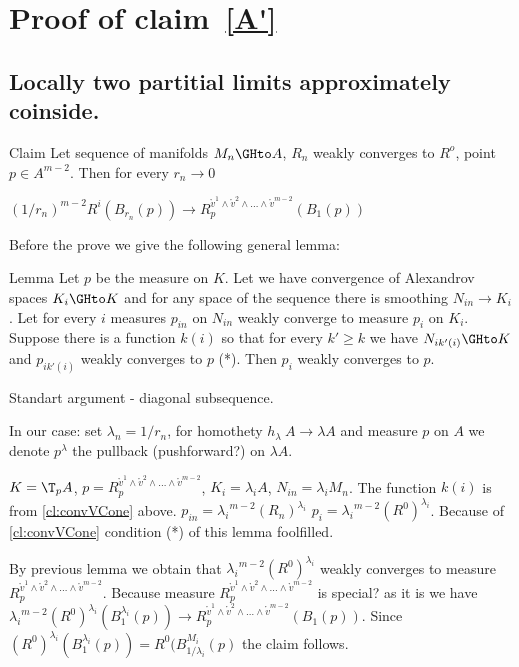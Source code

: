 \section{Proof of claim~\ref{A'}}\label{sec:codim2}
\subsection{Locally two partitial limits approximately coinside.}
\begin{thm}{Claim}\label{cl:convLocCodim2}
Let sequence of manifolds $M_n\GHto A$,
$R_n$ weakly converges to $R^o$,
point $p\in A^{m-2}$. Then
for every  $r_n\to 0$

$(1/r_n)^{m-2}R^i(B_{r_n}(p))\to R_p^{\mathring{v}^1\wedge \mathring{v}^2\wedge\dots\wedge \mathring{v}^{m-2}}(B_{1}(p))$

\end{thm}

Before the prove we give the following general lemma:

\begin{thm}{Lemma}
Let $p $ be the measure on $K$.
Let we have convergence of Alexandrov spaces $K_i\GHto K$
  and for  any space of the sequence there is smoothing $N_{in}\to  K_i$.
Let for every $i$ measures $p_{in}$ on $N_{in}$ weakly
converge to measure $p_i$ on $K_i$.
Suppose there is a function $k(i)$ so that
for every $k'\ge k$ we
have $N_{i k'(i)}\GHto K$ and
$p_{i k'(i)}$ weakly converges to $p$ (*).
Then $p_i$ weakly converges to $p$.

\end{thm}

 Standart argument - diagonal subsequence. \qeds

In our case: set $\lambda_n=1/r_n$,
for homothety $h_\lambda\:A\to \lambda A$ and measure
$p$ on $A$ we denote $p^\lambda$ the pullback (pushforward?) on  $\lambda A$.


$K={\T_p A}$, $p=R_p^{\mathring{v}^1\wedge \mathring{v}^2\wedge\dots\wedge
\mathring{v}^{m-2}}$,  $K_i={\lambda_i A}$,
$N_{in}=\lambda_i M_n$. The function $k(i)$ is
from \ref{cl:convVCone} above.
$p_{in}={\lambda_i}^{m-2}(R_n)^{\lambda_i}$
$p_i={\lambda_i}^{m-2}(R^0)^{\lambda_i}$.
Because of \ref{cl:convVCone} condition (*) of this lemma foolfilled.

By previous lemma we obtain that
${\lambda_i}^{m-2}(R^0)^{\lambda_i}$ weakly converges to measure
$R_p^{\mathring{v}^1\wedge \mathring{v}^2\wedge\dots\wedge
\mathring{v}^{m-2}}$.
Because measure $R_p^{\mathring{v}^1\wedge \mathring{v}^2\wedge\dots\wedge
\mathring{v}^{m-2}}$ is special? as  it is
we have ${\lambda_i}^{m-2}(R^0)^{\lambda_i}(B_1^{\lambda_i}(p))\to R_p^{\mathring{v}^1\wedge \mathring{v}^2\wedge\dots\wedge \mathring{v}^{m-2}}(B_{1}(p))$.
Since $(R^0)^{\lambda_i}(B_1^{\lambda_i}(p))=R^0(B_{1/\lambda_i}^{M_i}(p)$
the claim follows.
\qeds


